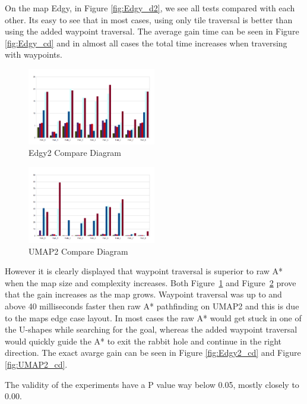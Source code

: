 \documentclass[a4paper]{article}
\begin{document}
On the map Edgy, in Figure \ref{fig:Edgy_d2}, we see all tests compared with each other. Its easy to see that in most cases, using only tile traversal is better than using the added waypoint traversal.
The average gain time can be seen in Figure \ref{fig:Edgy_cd} and in almost all cases the total time increases when traversing with waypoints.
	
\begin{figure}[h!]
\centering
\includegraphics[width=0.5\textwidth,height=\textheight,keepaspectratio]{ChartsAndFigures/Edgy2_d2.png}
\caption{Edgy2 Compare Diagram}
\label{fig:Edgy2_d2}
\end{figure}

\begin{figure}[h!]
\centering
\includegraphics[width=0.5\textwidth,height=\textheight,keepaspectratio]{ChartsAndFigures/UMAP2_d2.png}
\caption{UMAP2 Compare Diagram}
\label{fig:UMAP2_d2}
\end{figure}

However it is clearly displayed that waypoint traversal is superior to raw A* when the map size and complexity increases. Both Figure~\ref{fig:Edgy2_d2} and Figure~\ref{fig:UMAP2_d2} prove that the gain increases as the map grows.
Waypoint traversal was up to and above 40 milliseconds faster then raw A* pathfinding on UMAP2 and this is due to the maps edge case layout. In most cases the raw A* would get stuck in one of the U-shapes while searching for the goal, whereas the added waypoint traversal would quickly guide the A* to exit the rabbit hole and continue in the right direction. The exact avarge gain can be seen in Figure \ref{fig:Edgy2_cd} and Figure \ref{fig:UMAP2_cd}.
	
The validity of the experiments have a P value way below 0.05, mostly closely to 0.00.
\end{document}
